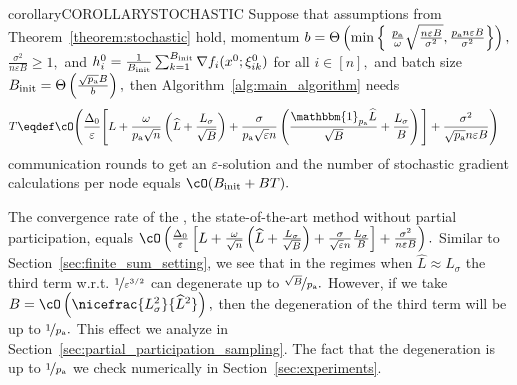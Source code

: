 \documentclass{article}
\newcommand{\algorithmname}{DASHA-PP}
\newcommand*{\probavailable}{\ensuremath{p_{\textnormal{a}}}}
\begin{document}
\begin{restatable}{corollary}{COROLLARYSTOCHASTIC}
  \label{cor:stochastic}
  Suppose that assumptions from Theorem~\ref{theorem:stochastic} hold, momentum $b = \Theta\left(\min \left\{\ \frac{\probavailable}{\omega}\sqrt{\frac{n \varepsilon B}{\sigma^2}}, \frac{\probavailable n \varepsilon B}{\sigma^2}\right\}\right),$ $\frac{\sigma^2}{n \varepsilon B} \geq 1,$
  and $h^{0}_i = \frac{1}{B_{\textnormal{init}}} \sum_{k = 1}^{B_{\textnormal{init}}} \nabla f_i(x^0; \xi^0_{ik})$ for all $i \in [n],$ and batch size $B_{\textnormal{init}} = \Theta\left(\frac{\sqrt{\probavailable} B}{b}\right),$ then Algorithm~\ref{alg:main_algorithm} \algname{(\algorithmname-MVR)} needs
  \begin{align*}&T \eqdef \cO\Bigg(\frac{\Delta_0}{\varepsilon}\Bigg[L + \frac{\omega}{\probavailable\sqrt{n}}\left(\widehat{L} + \frac{L_{\sigma}}{\sqrt{B}}\right) + \frac{\sigma}{\probavailable \sqrt{\varepsilon} n}\left(\frac{\mathbbm{1}_{\probavailable}\widehat{L}}{\sqrt{B}} + \frac{L_\sigma}{B}\right)\Bigg] + \frac{\sigma^2}{\sqrt{\probavailable} n \varepsilon B}\Bigg)\end{align*}
  communication rounds to get an $\varepsilon$-solution and the number of stochastic gradient calculations per node equals $\cO(B_{\textnormal{init}} + BT).$
\end{restatable}

The convergence rate of the , the state-of-the-art method without partial participation, equals $\cO\left(\frac{\Delta_0}{\varepsilon}\left[L + \frac{\omega}{\sqrt{n}}\left(\widehat{L} + \frac{L_{\sigma}}{\sqrt{B}}\right) + \frac{\sigma}{\sqrt{\varepsilon} n}\frac{L_\sigma}{B}\right] + \frac{\sigma^2}{n \varepsilon B}\right).$ Similar to Section~\ref{sec:finite_sum_setting}, we see that in the regimes when $\widehat{L} \approx L_{\sigma}$ the third term w.r.t. $\nicefrac{1}{\varepsilon^{3/2}}$ can degenerate up to $\nicefrac{\sqrt{B}}{\probavailable}.$ However, if we take $B = \cO\left(\nicefrac{L_{\sigma}^2}{\widehat{L}^2}\right),$ then the degeneration of the third term will be up to $\nicefrac{1}{\probavailable}.$ This effect we analyze in Section~\ref{sec:partial_participation_sampling}. The fact that the degeneration is up to $\nicefrac{1}{\probavailable}$ we check numerically in Section~\ref{sec:experiments}.
\end{document}
